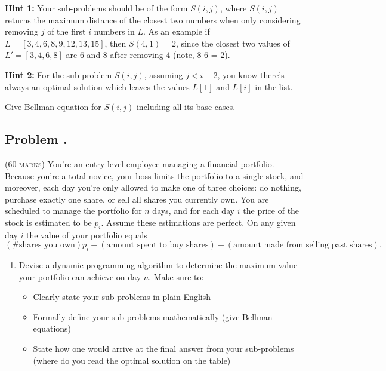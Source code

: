 \documentclass[12pt]{article}
\newcounter{ProblemNum}
\renewcommand{\theProblemNum}{\arabic{ProblemNum}}
\newcommand*{\anyproblem}[1]{\newpage\subsection*{#1}}
\newcommand*{\problem}[1]{\stepcounter{ProblemNum} %
\anyproblem{Problem \theProblemNum. \; #1}}
\begin{document}
\textbf{Hint 1:} Your sub-problems should be of the form $S(i,j)$, where $S(i,j)$ returns the maximum distance of the closest two numbers when only considering removing $j$ of the first $i$ numbers in $L$. As an example if $L = [3,4,6,8,9,12,13,15]$, then $S(4,1)=2$, since the closest two values of $L' = [3,4,6,8]$ are 6 and 8 after removing 4 (note, 8-6 = 2). 

\textbf{Hint 2:} For the sub-problem $S(i,j)$, assuming $j < i -2$, you know there's always an optimal solution which leaves the values $L[1]$ and $L[i]$ in the list.

Give Bellman equation for $S(i,j)$ including all its base cases.



\problem{}
\textsc{(60 marks)} You're an entry level employee managing a financial portfolio. Because you're a total novice, your boss limits the portfolio to a single stock, and moreover, each day you're only allowed to make one of three choices: do nothing, purchase exactly one share, or sell all shares you currently own. You are scheduled to manage the portfolio for $n$ days, and for each day $i$ the price of the stock is estimated to be $p_i$. Assume these estimations are perfect. On any given day $i$ the value of your portfolio equals
$$ (\#\text{shares you own})p_i - (\text{amount spent to buy  shares}) + (\text{amount made from selling past shares}).$$ 
\begin{enumerate}
\item Devise a dynamic programming algorithm to determine the maximum value your portfolio can achieve on day $n$. Make sure to:
\begin{itemize}
\item Clearly state your sub-problems in plain English
\item Formally define your sub-problems mathematically (give Bellman equations)
\item State how one would arrive at the final answer from your sub-problems (where do you read the optimal solution on the table)
\end{itemize}
\end{enumerate}
\end{document}
